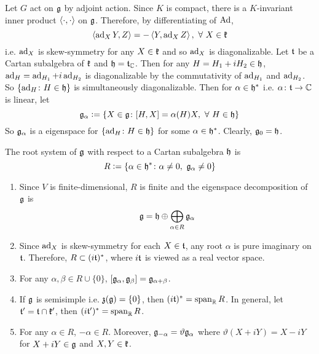 \documentclass[a4paper,12pt]{article}
\begin{document}
	Let $G$ act on $\mathfrak{g}$ by adjoint action. Since $K$ is compact, there is a $K$-invariant inner product $\left\langle \cdot,\cdot \right\rangle$ on $\mathfrak{g}$. Therefore, by differentiating of $\operatorname{Ad}$, 
	\begin{equation*}
	 	\left\langle \operatorname{ad}_X Y,Z \right\rangle = -\left\langle Y,\operatorname{ad}_X Z \right\rangle,~\forall~ X \in \mathfrak{k}
	\end{equation*}
	i.e. $\operatorname{ad}_X$ is skew-symmetry for any $X \in \mathfrak{k}$ and so $\operatorname{ad}_X$ is diagonalizable. Let $\mathfrak{t}$ be a Cartan subalgebra of $\mathfrak{k}$ and $\mathfrak{h} = \mathfrak{t}_{\mathbb{C}}$. Then for any $H = H_1+iH_2 \in \mathfrak{h}$, $\operatorname{ad}_H = \operatorname{ad}_{H_1}+i\operatorname{ad}_{H_2}$ is diagonalizable by the commutativity of $\operatorname{ad}_{H_1}$ and $\operatorname{ad}_{H_2}$. So $\left\{\operatorname{ad}_{H} \colon H \in \mathfrak{h}\right\}$ is simultaneously diagonalizable. Then for $\alpha \in \mathfrak{h}^*$ i.e. $\alpha \colon \mathfrak{t} \rightarrow \mathbb{C}$ is linear, let
	\begin{equation*}
		\mathfrak{g}_{\alpha} \vcentcolon= \left\{X \in \mathfrak{g} \colon [H,X] = \alpha(H)X,~\forall~H \in \mathfrak{h}\right\}
	\end{equation*}
	So $\mathfrak{g}_{\alpha}$ is a eigenspace for $\left\{\operatorname{ad}_{H} \colon H \in \mathfrak{h}\right\}$ for some $\alpha \in \mathfrak{h}^*$. Clearly, $\mathfrak{g}_{0} = \mathfrak{h}$.
	\begin{defn}
		The root system of $\mathfrak{g}$ with respect to a Cartan subalgebra $\mathfrak{h}$ is
		\begin{equation*}
			R \vcentcolon= \left\{\alpha \in \mathfrak{h}^* \colon \alpha \neq 0,~\mathfrak{g}_{\alpha} \neq 0\right\}
		\end{equation*}
	\end{defn}
	\begin{rem}
		\begin{enumerate}
			\item Since $V$ is finite-dimensional, $R$ is finite and the eigenspace decomposition of $\mathfrak{g}$ is
			\begin{equation*}
				\mathfrak{g} = \mathfrak{h} \oplus \bigoplus_{\alpha \in R} \mathfrak{g}_{\alpha}
			\end{equation*}
			\item Since $\operatorname{ad}_X$ is skew-symmetry for each $X \in \mathfrak{t}$, any root $\alpha$ is pure imaginary on $\mathfrak{t}$. Therefore, $R \subset (i\mathfrak{t})^*$, where $i\mathfrak{t}$ is viewed as a real vector space. 
			\item For any $\alpha,\beta \in R \cup \{0\}$, $[\mathfrak{g}_{\alpha},\mathfrak{g}_{\beta}] = \mathfrak{g}_{\alpha+\beta}$.
			\item If $\mathfrak{g}$ is semisimple i.e. $\mathfrak{z(g)} = \{0\}$, then $(i\mathfrak{t})^* = \operatorname{span}_{\mathbb{R}}R$. In general, let $\mathfrak{t}^{\prime} = \mathfrak{t} \cap \mathfrak{k}^{\prime}$, then $(i\mathfrak{t}^{\prime})^* = \operatorname{span}_{\mathbb{R}}R$.
			\item For any $\alpha \in R$, $-\alpha \in R$. Moreover, $\mathfrak{g}_{-\alpha} = \vartheta \mathfrak{g}_{\alpha}$ where $\vartheta(X+iY) = X-iY$ for $X+iY \in \mathfrak{g}$ and $X,Y \in \mathfrak{k}$.
		\end{enumerate}
	\end{rem}
\end{document}
